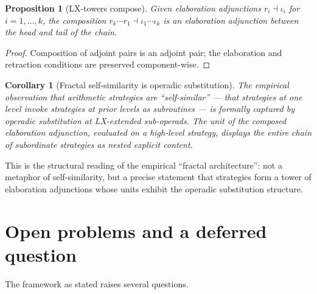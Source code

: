 \documentclass[11pt]{article}
\newtheorem{proposition}{Proposition}
\newtheorem{corollary}{Corollary}
\begin{document}
\begin{proposition}[LX-towers compose]
\label{prop:tower}
Given elaboration adjunctions $r_i \dashv \iota_i$ for $i = 1, \dots, k$, the
composition $r_k \cdots r_1 \dashv \iota_1 \cdots \iota_k$ is an
elaboration adjunction between the head and tail of the chain.
\end{proposition}

\begin{proof}
Composition of adjoint pairs is an adjoint pair; the elaboration and
retraction conditions are preserved component-wise.
\end{proof}

\begin{corollary}[Fractal self-similarity is operadic substitution]
The empirical observation that arithmetic strategies are
``self-similar'' — that strategies at one level invoke strategies at
prior levels as subroutines — is formally captured by operadic
substitution at LX-extended sub-operads. The unit of the composed
elaboration adjunction, evaluated on a high-level strategy, displays the
entire chain of subordinate strategies as nested explicit content.
\end{corollary}

This is the structural reading of the empirical ``fractal
architecture'': not a metaphor of self-similarity, but a precise
statement that strategies form a tower of elaboration adjunctions whose units
exhibit the operadic substitution structure.

\section{Open problems and a deferred question}\label{sec:open}

The framework as stated raises several questions.
\end{document}

